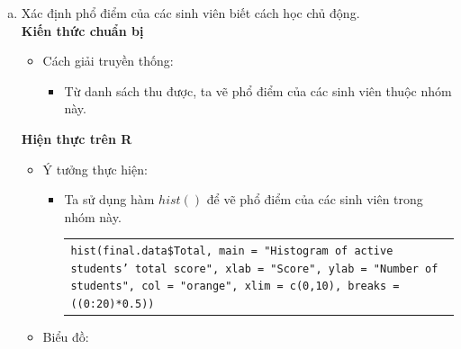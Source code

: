 \documentclass[a4paper]{article}
\theoremstyle{definition}
\begin{document}
\begin{enumerate}[a)]
\begin{itemize}
\begin{itemize}
\begin{center}
            \end{center}
        \end{itemize}
    \end{itemize}
    \bf\item {Xác định phổ điểm của các sinh viên biết cách học chủ động.}\\[6pt]
    \bf Kiến thức chuẩn bị\normalfont
    \begin{itemize}
        \item Cách giải truyền thống:
        \begin{itemize}
            \item Từ danh sách thu được, ta vẽ phổ điểm của các sinh viên thuộc nhóm này.
        \end{itemize}
    \end{itemize}
    \bf Hiện thực trên R\normalfont
    \begin{itemize}
        \item Ý tưởng thực hiện:
        \begin{itemize}
            \item Ta sử dụng hàm $hist()$ để vẽ phổ điểm của các sinh viên trong nhóm này.
            \begin{center}
                \begin{tabular}{p{13cm}}
                    \texttt{hist(final.data\$Total, main = "Histogram of active students' total score", xlab = "Score", ylab = "Number of students", col = "orange", xlim = c(0,10), breaks = ((0:20)*0.5))}
                \end{tabular}
            \end{center}
        \end{itemize}
        \item Biểu đồ:\\
        \begin{center}
            \begin{tabular}{c c}

\end{tabular}
\end{center}
\end{itemize}
\end{enumerate}
\end{document}
